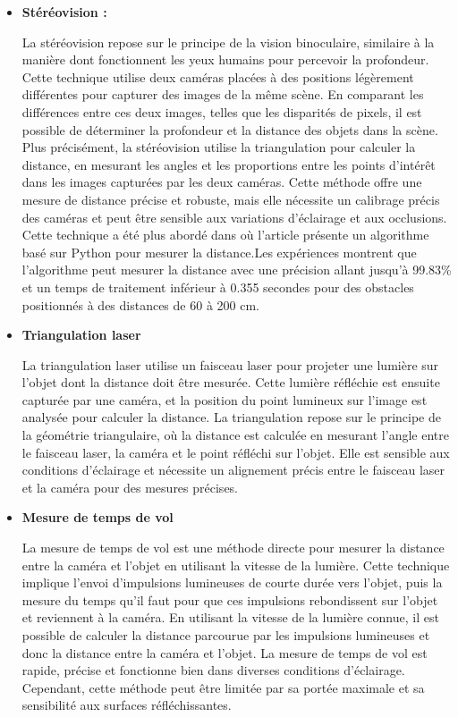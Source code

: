  \begin{itemize}[label={\Huge$\star$}]
 	
 	\item \textbf{Stéréovision :}
 	
 	La stéréovision repose sur le principe de la vision binoculaire, similaire à la manière dont fonctionnent les yeux humains pour percevoir la profondeur. Cette technique utilise deux caméras placées à des positions légèrement différentes pour capturer des images de la même scène. En comparant les différences entre ces deux images, telles que les disparités de pixels, il est possible de déterminer la profondeur et la distance des objets dans la scène. Plus précisément, la stéréovision utilise la triangulation pour calculer la distance, en mesurant les angles et les proportions entre les points d'intérêt dans les images capturées par les deux caméras. Cette méthode offre une mesure de distance précise et robuste, mais elle nécessite un calibrage précis des caméras et peut être sensible aux variations d'éclairage et aux occlusions. Cette technique a été plus abordé dans \cite{adil_novel_2022} où l’article présente un algorithme basé sur Python pour mesurer la distance.Les expériences montrent que l’algorithme peut mesurer la distance avec une précision allant jusqu’à 99.83\% et un temps de traitement inférieur à 0.355 secondes pour des obstacles positionnés à des distances de 60 à 200 cm.
 	
 	\item \textbf{Triangulation laser}
 	
 	La triangulation laser utilise un faisceau laser pour projeter une lumière sur l'objet dont la distance doit être mesurée. Cette lumière réfléchie est ensuite capturée par une caméra, et la position du point lumineux sur l'image est analysée pour calculer la distance. La triangulation repose sur le principe de la géométrie triangulaire, où la distance est calculée en mesurant l'angle entre le faisceau laser, la caméra et le point réfléchi sur l'objet. Elle est sensible aux conditions d'éclairage et nécessite un alignement précis entre le faisceau laser et la caméra pour des mesures précises.
 	
 	\item \textbf{Mesure de temps de vol }
 	
 	La mesure de temps de vol est une méthode directe pour mesurer la distance entre la caméra et l'objet en utilisant la vitesse de la lumière. Cette technique implique l'envoi d'impulsions lumineuses de courte durée vers l'objet, puis la mesure du temps qu'il faut pour que ces impulsions rebondissent sur l'objet et reviennent à la caméra. En utilisant la vitesse de la lumière connue, il est possible de calculer la distance parcourue par les impulsions lumineuses et donc la distance entre la caméra et l'objet. La mesure de temps de vol est rapide, précise et fonctionne bien dans diverses conditions d'éclairage.  Cependant, cette méthode peut être limitée par sa portée maximale et sa sensibilité aux surfaces réfléchissantes.

 \end{itemize}

